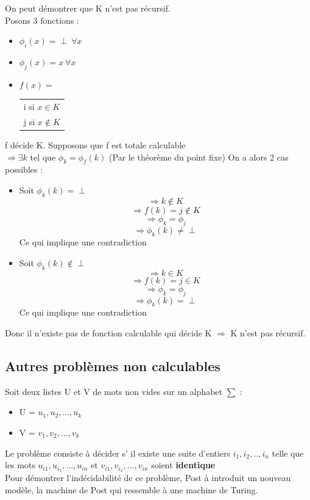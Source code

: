 \begin{myrem}
	On peut démontrer que K n'est pas récursif.\\
	Posons 3 fonctions :
	\begin{itemize}
		\item $\phi_i(x) = \perp \ \forall x$
		\item $\phi_j(x) = x \ \forall x$
		\item $f(x) = $ 
			\begin{tabular}{l}
				i si $x\in K$\\
				j si $x\notin K$\\
			\end{tabular}
	\end{itemize}
	f décide K. Supposons que f est totale calculable \\
	$ \Rightarrow \exists k$ tel que $\phi_k = \phi_f(k)$ (Par le théorème
du point fixe)
	On a alors 2 cas possibles :
	\begin{itemize}
		\item Soit $\phi_k(k)=\perp$
			\[ \Rightarrow k \notin K\]
			\[ \Rightarrow f(k)=j \notin K\]
			\[ \Rightarrow \phi_k = \phi_j \]
			\[ \Rightarrow \phi_k(k) \neq \perp\]
			Ce qui implique une contradiction
		\item Soit $\phi_k(k)\notin \perp$
			\[ \Rightarrow k \in K\]
			\[ \Rightarrow f(k)=j \in K\]
			\[ \Rightarrow \phi_k = \phi_j \]
			\[ \Rightarrow \phi_k(k) = \perp\]
			Ce qui implique une contradiction
	\end{itemize}
	Donc il n'existe pas de fonction calculable qui décide K $ \Rightarrow$ K n'est pas récursif.
\end{myrem}

\subsection{Autres problèmes non calculables}
\label{sub:autres_probl_mes_non_calculable}

\begin{mydef} Soit deux listes U et V 
	de mots non vides sur un alphabet $\sum$ : 
	\begin{itemize}
		\item U = ${u_1,u_2,...,u_k}$
		\item V = ${v_1,v_2,...,v_k}$
	\end{itemize}
	Le problème consiste à décider s’ il existe une suite d'entiers 
	$i_1,i_2,..,i_n$ telle que les mots $u_{i1},u_{i_2},...,u_{in}$ et 
	$v_{i1},v_{i_2},...,v_{in}$ soient \textbf{identique} \\
	Pour démontrer l'indécidabilité de ce problème, Post à introduit un 
	nouveau modèle, la machine de Post qui ressemble à une machine de Turing.
\end{mydef}

